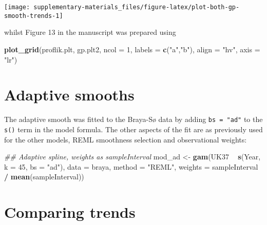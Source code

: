\documentclass[12pt,]{article}
\newenvironment{Shaded}{\begin{snugshade}}{\end{snugshade}}
\newcommand{\CommentTok}[1]{\textcolor[rgb]{0.56,0.35,0.01}{\textit{#1}}}
\newcommand{\DataTypeTok}[1]{\textcolor[rgb]{0.13,0.29,0.53}{#1}}
\newcommand{\DecValTok}[1]{\textcolor[rgb]{0.00,0.00,0.81}{#1}}
\newcommand{\KeywordTok}[1]{\textcolor[rgb]{0.13,0.29,0.53}{\textbf{#1}}}
\newcommand{\NormalTok}[1]{#1}
\newcommand{\OperatorTok}[1]{\textcolor[rgb]{0.81,0.36,0.00}{\textbf{#1}}}
\newcommand{\StringTok}[1]{\textcolor[rgb]{0.31,0.60,0.02}{#1}}
\begin{document}
\begin{center}\texttt{[image: supplementary-materials\_files/figure-latex/plot-both-gp-smooth-trends-1]} \end{center}

whilst Figure 13 in the manuscript was prepared using

\begin{Shaded}
\begin{Highlighting}[]
\KeywordTok{plot_grid}\NormalTok{(proflik.plt, gp.plt2, }\DataTypeTok{ncol =} \DecValTok{1}\NormalTok{, }\DataTypeTok{labels =} \KeywordTok{c}\NormalTok{(}\StringTok{"a"}\NormalTok{,}\StringTok{"b"}\NormalTok{),}
          \DataTypeTok{align =} \StringTok{"hv"}\NormalTok{, }\DataTypeTok{axis =} \StringTok{"lr"}\NormalTok{)}
\end{Highlighting}
\end{Shaded}

\hypertarget{adaptive-smooths}{%
\section{Adaptive smooths}\label{adaptive-smooths}}

The adaptive smooth was fitted to the Braya-Sø data by adding
\texttt{bs\ =\ "ad"} to the \texttt{s()} term in the model formula. The
other aspects of the fit are as previously used for the other models,
REML smoothness selection and observational weights:

\begin{Shaded}
\begin{Highlighting}[]
\CommentTok{## Adaptive spline, weights as sampleInterval}
\NormalTok{mod_ad <-}\StringTok{ }\KeywordTok{gam}\NormalTok{(UK37 }\OperatorTok{~}\StringTok{ }\KeywordTok{s}\NormalTok{(Year, }\DataTypeTok{k =} \DecValTok{45}\NormalTok{, }\DataTypeTok{bs =} \StringTok{"ad"}\NormalTok{), }\DataTypeTok{data =}\NormalTok{ braya,}
              \DataTypeTok{method =} \StringTok{"REML"}\NormalTok{,}
              \DataTypeTok{weights =}\NormalTok{ sampleInterval }\OperatorTok{/}\StringTok{ }\KeywordTok{mean}\NormalTok{(sampleInterval))}
\end{Highlighting}
\end{Shaded}

\hypertarget{comparing-trends}{%
\section{Comparing trends}\label{comparing-trends}}
\end{document}
